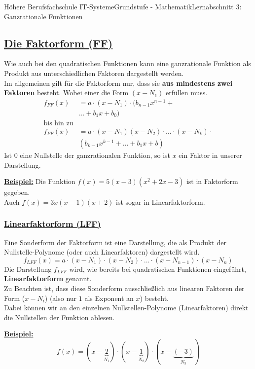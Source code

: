 \documentclass[11pt,twocolumn,oneside,openany,headings=optiontotoc,11pt,numbers=noenddot]{article}
\begin{document}
\begin{worksheet}{Höhere Berufsfachschule IT-Systeme}{Grundstufe - Mathematik}{Lernabschnitt 3: Ganzrationale Funktionen}
		\subsection*{\underline{Die Faktorform (FF)}}
		Wie auch bei den quadratischen Funktionen kann eine ganzrationale Funktion als Produkt aus unterschiedlichen Faktoren dargestellt werden.\\
		Im allgemeinen gilt für die Faktorform nur, dass sie \textbf{aus mindestens zwei Faktoren} besteht. Wobei einer die Form \((x-N_1)\) erfüllen muss.
		\begin{align*}
			f_{FF}(x) & = a\cdot{}(x-N_1)\cdot{}(b_{n-1}x^{n-1}+\\
			&\ldots{}+b_1x+ b_0)\\
			\text{bis hin zu}\\
			f_{FF}(x) & = a\cdot{}(x-N_1)(x-N_2)\cdot{}\ldots{}\cdot{}(x-N_k)\cdot\\
			&(b_{k-1}x^{k-1} + \ldots + b_1x + b)
		\end{align*}
		Ist \(0\) eine Nullstelle der ganzrationalen Funktion, so ist \(x\) ein Faktor in unserer Darstellung.\\
		\par\noindent
		\textbf{\underline{Beispiel:}} Die Funktion \(f(x) = 5(x-3)(x^2+2x-3)\) ist in Faktorform gegeben.\\
		Auch \(f(x) = 3x(x-1)(x+2)\) ist sogar in Linearfaktorform.
		\subsubsection*{\underline{Linearfaktorform (LFF)}}
		Eine Sonderform der Faktorform ist eine Darstellung, die als Produkt der \grq{}Nullstelle-Polynome\grq{} (oder auch Linearfaktoren) dargestellt wird.
		\[f_{LFF}(x) = a\cdot{}(x-N_1)\cdot{}(x-N_2)\cdot{}\ldots{}\cdot{}(x-N_{n-1})\cdot{}(x-N_n)\]
		Die Darstellung \(f_{LFF}\) wird, wie bereits bei quadratischen Funktionen eingeführt, \textbf{Linearfaktorform} genannt.\\
		Zu Beachten ist, dass diese Sonderform ausschließlich aus linearen Faktoren der Form (\(x-N_i\)) (also nur \(1\) als Exponent an \(x\)) besteht.\\
		Dabei können wir an den einzelnen \grq{}Nullstellen-Polynome\grq{} (Linearfaktoren) direkt die Nullstellen der Funktion ablesen.\\
		\par\noindent
		\underline{\textbf{Beispiel:}}\[f(x) = (x-\underbrace{2}_{N_1})\cdot(x-\underbrace{1}_{N_2})\cdot(x-\underbrace{(-3)}_{N_3})\]

\end{worksheet}
\end{document}
